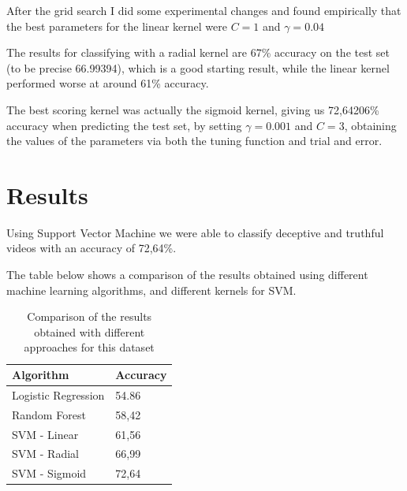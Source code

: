 After the grid search I did some experimental changes and found empirically that the best parameters for the linear kernel were $C = 1$ and $\gamma = 0.04$

The results for classifying with a radial kernel are 67\% accuracy on the test set (to be precise 66.99394), which is a good starting result, while the linear kernel performed worse at around 61\% accuracy.

The best scoring kernel was actually the sigmoid kernel, giving us 72,64206\% accuracy when predicting the test set, by setting $\gamma  = 0.001$ and $C = 3$, obtaining the values of the parameters via both the tuning function and trial and error.

\clearpage

\section{Results} \label{results}
Using Support Vector Machine we were able to classify deceptive and truthful videos with an accuracy of 72,64\%.

The table below shows a comparison of the results obtained using different machine learning algorithms, and different kernels for SVM.

\begin{table}[H]
	\centering
	\begin{tabular}{|l|l|}
		\hline
		\textbf{Algorithm}  & \textbf{Accuracy} \\ \hline
		Logistic Regression & 54.86             \\ \hline
		Random Forest       & 58,42             \\ \hline
		SVM - Linear        & 61,56             \\ \hline
		SVM - Radial        & 66,99             \\ \hline
		SVM - Sigmoid       & 72,64             \\ \hline
	\end{tabular}
	\caption{Comparison of the results obtained with different approaches for this dataset}
\end{table}